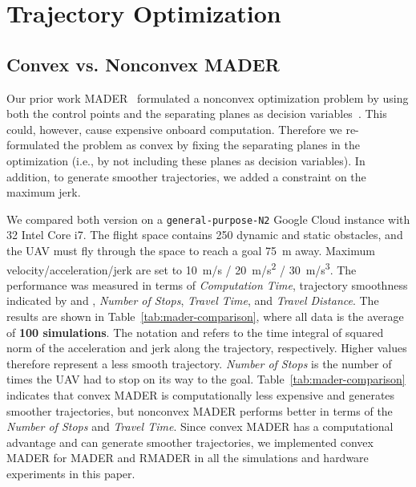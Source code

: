 \chapter{Trajectory Optimization}\label{chap:trajectory-optimization}

\section{Convex vs. Nonconvex MADER}

Our prior work MADER~\cite{tordesillas2020mader} formulated a nonconvex optimization problem by using both the control points and the separating planes as decision variables~\cite[Section VI-D]{tordesillas2020mader}. This could, however, cause expensive onboard computation. Therefore we re-formulated the problem as convex by fixing the separating planes in the optimization (i.e., by not including these planes as decision variables). In addition, to generate smoother trajectories, we added a constraint on the maximum jerk. 

We compared both version on a \texttt{general-purpose-N2} Google Cloud instance with 32 Intel\textsuperscript{\small\textregistered} Core i7. The flight space contains 250 dynamic and static obstacles, and the UAV must fly through the space to reach a goal \SI{75}{m} away. Maximum velocity/acceleration/jerk are set to \SI{10}{\m/\s} / \SI{20}{\m/\s^2} / \SI{30}{\m/\s^3}. The performance was measured in terms of \emph{Computation Time}, trajectory smoothness indicated by \intaccelsquared{} and \intjerksquared{}, \emph{Number of Stops}, \emph{Travel Time}, and \emph{Travel Distance}. The results are shown in Table~\ref{tab:mader-comparison}, where all data is the average of \textbf{100 simulations}. The notation \intaccelsquared{} and \intjerksquared{} refers to the time integral of squared norm of the acceleration and jerk along the trajectory, respectively. Higher values therefore represent a less smooth trajectory. \emph{Number of Stops} is the number of times the UAV had to stop on its way to the goal. Table~\ref{tab:mader-comparison} indicates that convex MADER is computationally less expensive and generates smoother trajectories, but nonconvex MADER performs better in terms of the \emph{Number of Stops} and \emph{Travel Time}. Since convex MADER has a computational advantage and can generate smoother trajectories, we implemented convex MADER for MADER and RMADER in all the simulations and hardware experiments in this paper.   

